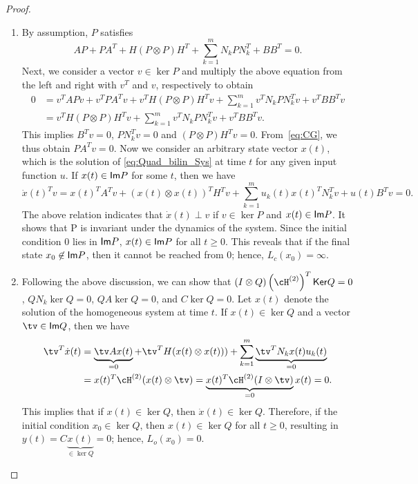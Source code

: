 \begin{proof}\
\begin{enumerate}[label=(\alph*)]
	\item By assumption, $P$ satisfies
\begin{equation}\label{eq:CG}
AP + PA^T + H(P\otimes P)H^T +\sum_{k=1}^mN_kPN_k^T + BB^T =0.
\end{equation}
Next, we consider a vector  $v \in \ker P$ and multiply the above equation from the left and right with $v^T$ and $v$, respectively to obtain
\begin{align*}
0&= v^TAPv + v^TPA^Tv + v^TH(P\otimes P)H^Tv +\sum_{k=1}^mv^TN_kPN_k^Tv + v^TBB^Tv\\
&=v^TH(P\otimes P)H^Tv +\sum_{k=1}^mv^TN_kPN_k^Tv + v^TBB^Tv.
\end{align*}
This implies $B^Tv = 0$, $PN_k^T v=0$ and $(P\otimes P)H^T v=0$. From~\eqref{eq:CG}, we  thus obtain $PA^Tv = 0$. Now we consider an arbitrary state vector $x(t)$, which is the solution of \eqref{eq:Quad_bilin_Sys} at time $t$ for any given input function $u$. If $x(t) \in {\mathsf{Im}} P $ for some $t$, then we have
\begin{equation*}
\dot{x}(t)^Tv = x(t)^TA^Tv + \left(x(t)\otimes x(t)\right)^TH^Tv + \sum_{k=1}^mu_k(t)x(t)^TN_k^Tv + u(t)B^Tv = 0.
\end{equation*}
The above relation indicates that $\dot x(t) \perp v$ if $v\in \ker P$ and $x(t) \in {\mathsf{Im}} P$.  It shows that \im P is invariant under the dynamics of the system. Since the initial condition $0$ lies in ${\mathsf{Im}} P$,  $x(t) \in {\mathsf{Im}} P$ for all $t\geq 0$. This reveals that if the final state $x_0 \not\in {\mathsf{Im}} P$, then it cannot be reached from $0$; hence, $L_c(x_0) =\infty$.
\item Following the above discussion, we can show that $(I\otimes Q )  \left(\cH^{(2)}\right)^T \ker Q = 0$, $QN_k\ker Q =0$, $QA\ker Q = 0$, and $C\ker Q =0$.  Let $x(t)$ denote the solution of the homogeneous system at time $t$. If $x(t)\in \ker Q$ and a vector $\tv \in \im Q$, then we have
\begin{align*}
\tv^T\dot x(t)&= \underbrace{\tv Ax(t) }_{=0}+ \tv^TH(x(t)\otimes x(t)))+ \sum_{k=1}^m\underbrace{\tv^TN_kx(t)u_k(t)}_{=0}\\
&= x(t)^T\cH^{(2)}(x(t)\otimes \tv) = \underbrace{x(t)^T\cH^{(2)}(I\otimes \tv)}_{=0}x(t) = 0.
\end{align*}
This implies that if $x(t) \in  \ker Q$, then $\dot x(t)  \in\ker Q$.  Therefore, if the initial condition $x_0 \in   \ker Q$, then $x(t)\in \ker Q$ for all $t\geq 0$, resulting in $y(t)=C\underbrace{x(t)}_{\in \ker Q} = 0$; hence, $L_o(x_0) = 0$.
\end{enumerate}
\end{proof}


